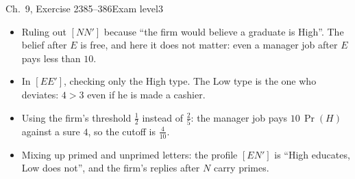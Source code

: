 \begin{exsol}{\MG{} Ch.~9, Exercise 2}{385--386}{Exam level}{3}
\mistakes
\begin{itemize}
  \item Ruling out $[NN']$ because ``the firm would believe a graduate is High''. The belief after $E$ is free,
  and here it does not matter: even a manager job after $E$ pays less than $10$.
  \item In $[EE']$, checking only the High type. The Low type is the one who deviates: $4 > 3$ even if he is
  made a cashier.
  \item Using the firm's threshold $\frac12$ instead of $\frac25$: the manager job pays $10\,\Pr(H)$ against a
  sure $4$, so the cutoff is $\frac{4}{10}$.
  \item Mixing up primed and unprimed letters: the profile $[EN']$ is ``High educates, Low does not'', and the
  firm's replies after $N$ carry primes.
\end{itemize}

\end{exsol}
